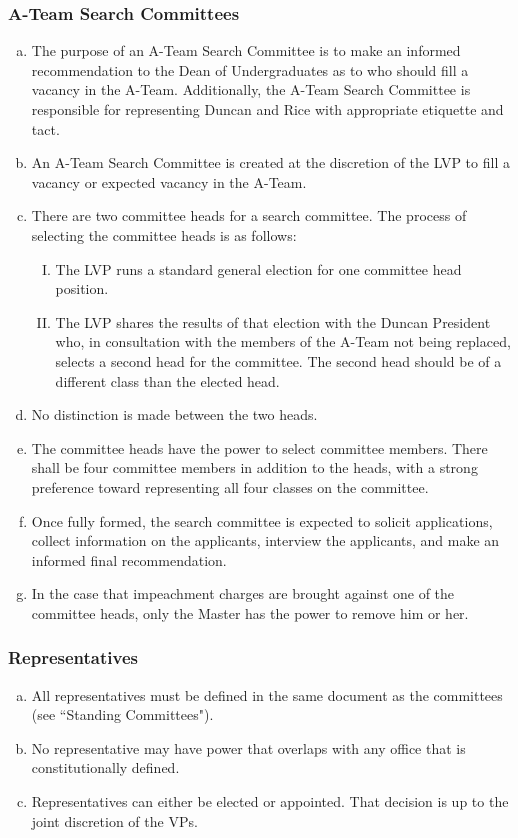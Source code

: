 \documentclass[USletter,12pt]{article}
\begin{document}
\subsubsection{A-Team Search Committees}
	\begin{enumerate}[(a)]
	\item The purpose of an A-Team Search Committee is to make an informed recommendation to the Dean of Undergraduates as to who should fill a vacancy in the A-Team.  Additionally, the A-Team Search Committee is responsible for representing Duncan and Rice with appropriate etiquette and tact.
	\item An A-Team Search Committee is created at the discretion of the LVP to fill a vacancy or expected vacancy in the A-Team.
	\item There are two committee heads for a search committee.  The process of selecting the committee heads is as follows:
		\begin{enumerate}[(I)]
		\item The LVP runs a standard general election for one committee head position.
		\item The LVP shares the results of that election with the Duncan President who, in consultation with the members of the A-Team not being replaced, selects a second head for the committee.  The second head should be of a different class than the elected head.
		\end{enumerate}
	\item No distinction is made between the two heads.
	\item The committee heads have the power to select committee members.  There shall be four committee members in addition to the heads, with a strong preference toward representing all four classes on the committee. 
	\item Once fully formed, the search committee is expected to solicit applications, collect information on the applicants, interview the applicants, and make an informed final recommendation.
	\item In the case that impeachment charges are brought against one of the committee heads, only the Master has the power to remove him or her.
	\end{enumerate}

\subsubsection{Representatives}
	\begin{enumerate}[(a)]
	\item All representatives must be defined in the same document as the committees (see ``Standing Committees").
	\item No representative may have power that overlaps with any office that is constitutionally defined.
	\item Representatives can either be elected or appointed.  That decision is up to the joint discretion of the VPs.
	\end{enumerate}
\end{document}
